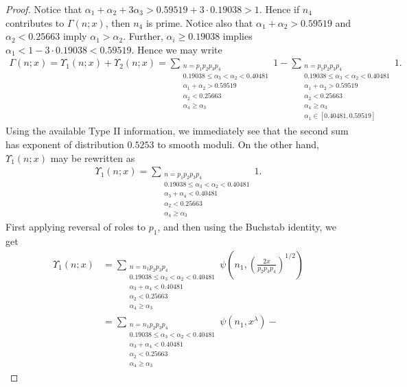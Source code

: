 \documentclass{amsart}
\numberwithin{equation}{section}
\begin{document}
\begin{proof}
Notice that $\alpha_1+\alpha_2 +3\alpha_3 > 0.59519 + 3 \cdot 0.19038 >1$. Hence if $n_4$ contributes to $\Gamma(n;x)$, then $n_4$ is prime. Notice also that $\alpha_1 + \alpha_2 > 0.59519$ and $\alpha_2 < 0.25663$ imply $\alpha_1 > \alpha_2$. Further, $\alpha_i \geq 0.19038$ implies $\alpha_1 < 1- 3 \cdot 0.19038 < 0.59519$. Hence we may write  
\begin{align*}
\Gamma(n;x)= \Upsilon_1(n;x)+\Upsilon_2(n;x)= \sum_{\substack{ n = p_1p_2p_3p_4 \\ 0.19038 \leq \alpha_3 <\alpha_2 < 0.40481 \\ \alpha_1+\alpha_2 > 0.59519 \\ \alpha_2 < 0.25663 \\ \alpha_4 \geq \alpha_3}} 1 - \sum_{\substack{ n = p_1p_2p_3p_4 \\ 0.19038 \leq \alpha_3 <\alpha_2 < 0.40481 \\ \alpha_1+\alpha_2 > 0.59519 \\ \alpha_2 < 0.25663 \\ \alpha_4 \geq \alpha_3 \\ \alpha_1 \in [0.40481,0.59519]}} 1.
\end{align*}
Using the available Type II information, we immediately see that the second sum has exponent of distribution $0.5253$ to smooth moduli.  On the other hand, $\Upsilon_1(n;x)$ may be rewritten as 
\begin{align*}
\Upsilon_1(n;x)= \sum_{\substack{ n = p_1p_2p_3p_4 \\ 0.19038 \leq \alpha_3 <\alpha_2 < 0.40481 \\ \alpha_3+\alpha_4 < 0.40481 \\ \alpha_2 < 0.25663 \\ \alpha_4 \geq \alpha_3}} 1.
\end{align*}
First applying reversal of roles to $p_1$, and then using the Buchstab identity, we get 
\begin{align*}
\Upsilon_1(n;x)&= \sum_{\substack{ n = n_1p_2p_3p_4 \\ 0.19038 \leq \alpha_3 <\alpha_2 < 0.40481 \\ \alpha_3+\alpha_4 < 0.40481 \\ \alpha_2 < 0.25663 \\ \alpha_4 \geq \alpha_3}} \psi(n_1,(\tfrac{2x}{p_2p_3p_4})^{1/2}) \\
&= \sum_{\substack{ n = n_1p_2p_3p_4 \\ 0.19038 \leq \alpha_3 <\alpha_2 < 0.40481 \\ \alpha_3+\alpha_4 < 0.40481 \\ \alpha_2 < 0.25663 \\ \alpha_4 \geq \alpha_3}} \psi(n_1,x^\lambda) -

\end{align*}
\end{proof}
\end{document}
